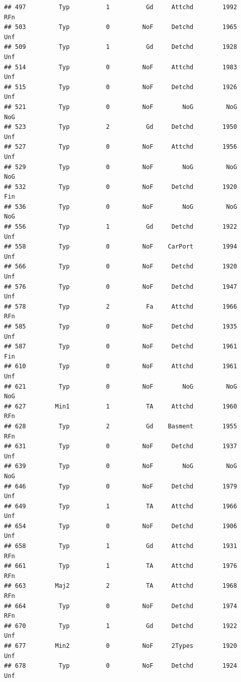 \documentclass[]{article}
\begin{document}
\begin{verbatim}
## 497         Typ          1          Gd     Attchd        1992          RFn
## 503         Typ          0         NoF     Detchd        1965          Unf
## 509         Typ          1          Gd     Detchd        1928          Unf
## 514         Typ          0         NoF     Attchd        1983          Unf
## 515         Typ          0         NoF     Detchd        1926          Unf
## 521         Typ          0         NoF        NoG         NoG          NoG
## 523         Typ          2          Gd     Detchd        1950          Unf
## 527         Typ          0         NoF     Attchd        1956          Unf
## 529         Typ          0         NoF        NoG         NoG          NoG
## 532         Typ          0         NoF     Detchd        1920          Fin
## 536         Typ          0         NoF        NoG         NoG          NoG
## 556         Typ          1          Gd     Detchd        1922          Unf
## 558         Typ          0         NoF    CarPort        1994          Unf
## 566         Typ          0         NoF     Detchd        1920          Unf
## 576         Typ          0         NoF     Detchd        1947          Unf
## 578         Typ          2          Fa     Attchd        1966          RFn
## 585         Typ          0         NoF     Detchd        1935          Unf
## 587         Typ          0         NoF     Detchd        1961          Fin
## 610         Typ          0         NoF     Attchd        1961          Unf
## 621         Typ          0         NoF        NoG         NoG          NoG
## 627        Min1          1          TA     Attchd        1960          RFn
## 628         Typ          2          Gd    Basment        1955          RFn
## 631         Typ          0         NoF     Detchd        1937          Unf
## 639         Typ          0         NoF        NoG         NoG          NoG
## 646         Typ          0         NoF     Detchd        1979          Unf
## 649         Typ          1          TA     Attchd        1966          Unf
## 654         Typ          0         NoF     Detchd        1906          Unf
## 658         Typ          1          Gd     Attchd        1931          RFn
## 661         Typ          1          TA     Attchd        1976          RFn
## 663        Maj2          2          TA     Attchd        1968          RFn
## 664         Typ          0         NoF     Detchd        1974          RFn
## 670         Typ          1          Gd     Detchd        1922          Unf
## 677        Min2          0         NoF     2Types        1920          Unf
## 678         Typ          0         NoF     Detchd        1924          Unf

\end{verbatim}
\end{document}
